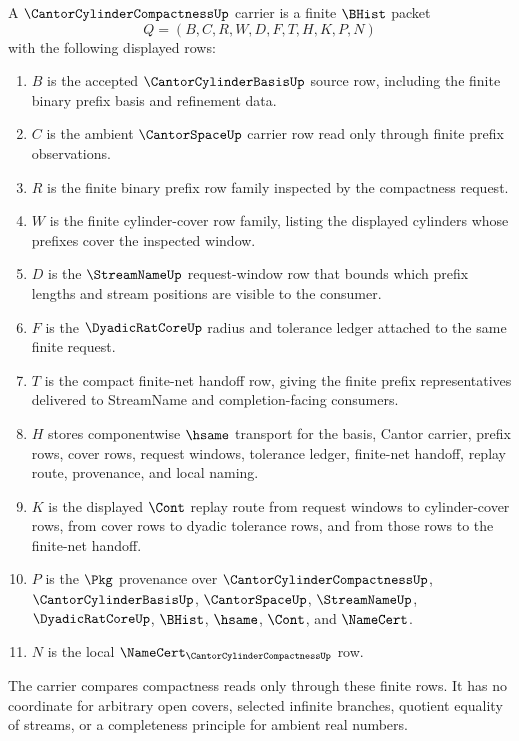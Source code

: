 \begin{definition}
\label{def:cantor-cylinder-compactness-carrier}
A $\CantorCylinderCompactnessUp$ carrier is a finite $\BHist$ packet
$$
Q=(B,C,R,W,D,F,T,H,K,P,N)
$$
with the following displayed rows:
\begin{enumerate}
\item $B$ is the accepted $\CantorCylinderBasisUp$ source row, including the finite binary prefix basis and refinement data.
\item $C$ is the ambient $\CantorSpaceUp$ carrier row read only through finite prefix observations.
\item $R$ is the finite binary prefix row family inspected by the compactness request.
\item $W$ is the finite cylinder-cover row family, listing the displayed cylinders whose prefixes cover the inspected window.
\item $D$ is the $\StreamNameUp$ request-window row that bounds which prefix lengths and stream positions are visible to the consumer.
\item $F$ is the $\DyadicRatCoreUp$ radius and tolerance ledger attached to the same finite request.
\item $T$ is the compact finite-net handoff row, giving the finite prefix representatives delivered to StreamName and completion-facing consumers.
\item $H$ stores componentwise $\hsame$ transport for the basis, Cantor carrier, prefix rows, cover rows, request windows, tolerance ledger, finite-net handoff, replay route, provenance, and local naming.
\item $K$ is the displayed $\Cont$ replay route from request windows to cylinder-cover rows, from cover rows to dyadic tolerance rows, and from those rows to the finite-net handoff.
\item $P$ is the $\Pkg$ provenance over $\CantorCylinderCompactnessUp$, $\CantorCylinderBasisUp$, $\CantorSpaceUp$, $\StreamNameUp$, $\DyadicRatCoreUp$, $\BHist$, $\hsame$, $\Cont$, and $\NameCert$.
\item $N$ is the local $\NameCert_{\CantorCylinderCompactnessUp}$ row.
\end{enumerate}
The carrier compares compactness reads only through these finite rows. It has no coordinate for arbitrary open covers, selected infinite branches, quotient equality of streams, or a completeness principle for ambient real numbers.
\end{definition}

